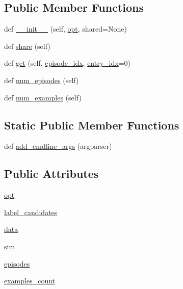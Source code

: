 \subsection*{Public Member Functions}
\begin{DoxyCompactItemize}
\item 
def \hyperlink{classparlai_1_1tasks_1_1talkthewalk_1_1base_1_1TTWBase_abde7fa2ca98467601795e5873285d8a0}{\+\_\+\+\_\+init\+\_\+\+\_\+} (self, \hyperlink{classparlai_1_1tasks_1_1talkthewalk_1_1base_1_1TTWBase_aa716b1fde5dd6d0409ff111df962067e}{opt}, shared=None)
\item 
def \hyperlink{classparlai_1_1tasks_1_1talkthewalk_1_1base_1_1TTWBase_ac8cfd853c90d3dbc0ee6ada6dbc23726}{share} (self)
\item 
def \hyperlink{classparlai_1_1tasks_1_1talkthewalk_1_1base_1_1TTWBase_adda57628371cdbb1afef6f297dab7c54}{get} (self, \hyperlink{classparlai_1_1core_1_1teachers_1_1FixedDialogTeacher_afd4ebab8063eb42d182d30a1a41f133e}{episode\+\_\+idx}, \hyperlink{classparlai_1_1core_1_1teachers_1_1FixedDialogTeacher_ae3201b15f3c3b46a2f3511bad9b43e7d}{entry\+\_\+idx}=0)
\item 
def \hyperlink{classparlai_1_1tasks_1_1talkthewalk_1_1base_1_1TTWBase_ab4890c4569ff31724718ed8c684e1a76}{num\+\_\+episodes} (self)
\item 
def \hyperlink{classparlai_1_1tasks_1_1talkthewalk_1_1base_1_1TTWBase_a691d7f4a22c6ea032489ea70fe5d6b35}{num\+\_\+examples} (self)
\end{DoxyCompactItemize}
\subsection*{Static Public Member Functions}
\begin{DoxyCompactItemize}
\item 
def \hyperlink{classparlai_1_1tasks_1_1talkthewalk_1_1base_1_1TTWBase_a58e285e5ba5843219867ad14512bde8a}{add\+\_\+cmdline\+\_\+args} (argparser)
\end{DoxyCompactItemize}
\subsection*{Public Attributes}
\begin{DoxyCompactItemize}
\item 
\hyperlink{classparlai_1_1tasks_1_1talkthewalk_1_1base_1_1TTWBase_aa716b1fde5dd6d0409ff111df962067e}{opt}
\item 
\hyperlink{classparlai_1_1tasks_1_1talkthewalk_1_1base_1_1TTWBase_a66874e232187d869705096b64775448e}{label\+\_\+candidates}
\item 
\hyperlink{classparlai_1_1tasks_1_1talkthewalk_1_1base_1_1TTWBase_a3080a626f294ef819e26aedb322ee99a}{data}
\item 
\hyperlink{classparlai_1_1tasks_1_1talkthewalk_1_1base_1_1TTWBase_a723ca7277cb3040cbfef0d9ef3161df3}{sim}
\item 
\hyperlink{classparlai_1_1tasks_1_1talkthewalk_1_1base_1_1TTWBase_a0c6f24b6c2fa6e69d28606ac2cabab01}{episodes}
\item 
\hyperlink{classparlai_1_1tasks_1_1talkthewalk_1_1base_1_1TTWBase_a6d2d68b1aba27c50ce67efc0c0f07dc4}{examples\+\_\+count}
\end{DoxyCompactItemize}
